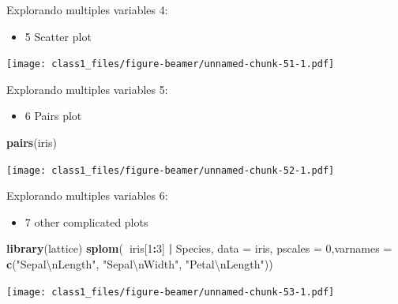 \documentclass[ignorenonframetext,]{beamer}
\newenvironment{Shaded}{\begin{snugshade}}{\end{snugshade}}
\newcommand{\KeywordTok}[1]{\textcolor[rgb]{0.13,0.29,0.53}{\textbf{#1}}}
\newcommand{\DataTypeTok}[1]{\textcolor[rgb]{0.13,0.29,0.53}{#1}}
\newcommand{\DecValTok}[1]{\textcolor[rgb]{0.00,0.00,0.81}{#1}}
\newcommand{\CharTok}[1]{\textcolor[rgb]{0.31,0.60,0.02}{#1}}
\newcommand{\StringTok}[1]{\textcolor[rgb]{0.31,0.60,0.02}{#1}}
\newcommand{\OperatorTok}[1]{\textcolor[rgb]{0.81,0.36,0.00}{\textbf{#1}}}
\newcommand{\NormalTok}[1]{#1}
\providecommand{\tightlist}{%
  \setlength{\itemsep}{0pt}\setlength{\parskip}{0pt}}
\begin{document}
\begin{frame}[fragile]{Explorando multiples variables 4:}

\begin{itemize}
\tightlist
\item
  5 Scatter plot
\end{itemize}

\begin{Shaded}
\end{Shaded}

\texttt{[image: class1\_files/figure-beamer/unnamed-chunk-51-1.pdf]}

\end{frame}

\begin{frame}[fragile]{Explorando multiples variables 5:}

\begin{itemize}
\tightlist
\item
  6 Pairs plot
\end{itemize}

\begin{Shaded}
\begin{Highlighting}[]
\KeywordTok{pairs}\NormalTok{(iris)}
\end{Highlighting}
\end{Shaded}

\texttt{[image: class1\_files/figure-beamer/unnamed-chunk-52-1.pdf]}

\end{frame}

\begin{frame}[fragile]{Explorando multiples variables 6:}

\begin{itemize}
\tightlist
\item
  7 other complicated plots
\end{itemize}

\begin{Shaded}
\begin{Highlighting}[]
\KeywordTok{library}\NormalTok{(lattice)}
\KeywordTok{splom}\NormalTok{(}\OperatorTok{~}\NormalTok{iris[}\DecValTok{1}\OperatorTok{:}\DecValTok{3}\NormalTok{] }\OperatorTok{|}\StringTok{ }\NormalTok{Species, }\DataTypeTok{data =}\NormalTok{ iris, }\DataTypeTok{pscales =} \DecValTok{0}\NormalTok{,}\DataTypeTok{varnames =} \KeywordTok{c}\NormalTok{(}\StringTok{"Sepal}\CharTok{\textbackslash{}n}\StringTok{Length"}\NormalTok{, }\StringTok{"Sepal}\CharTok{\textbackslash{}n}\StringTok{Width"}\NormalTok{, }\StringTok{"Petal}\CharTok{\textbackslash{}n}\StringTok{Length"}\NormalTok{))}
\end{Highlighting}
\end{Shaded}

\texttt{[image: class1\_files/figure-beamer/unnamed-chunk-53-1.pdf]}

\end{frame}
\end{document}

